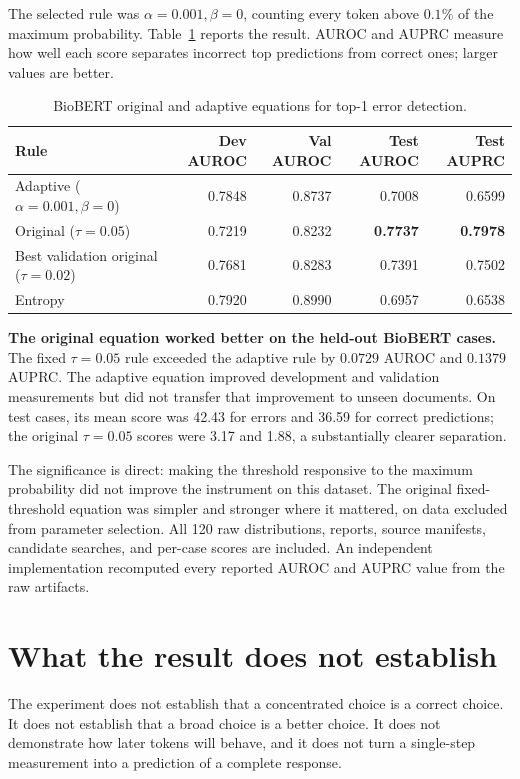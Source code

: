 \documentclass[11pt,a4paper]{article}
\begin{document}
The selected rule was $\alpha=0.001,\beta=0$, counting every token above $0.1\%$ of the maximum probability. Table~\ref{tab:biobert-optimization} reports the result. AUROC and AUPRC measure how well each score separates incorrect top predictions from correct ones; larger values are better.

\begin{table}[h]
\centering
\caption{BioBERT original and adaptive equations for top-1 error detection.}
\label{tab:biobert-optimization}
{\scriptsize
\setlength{\tabcolsep}{4pt}
\begin{tabular}{p{5.2cm}rrrr}
\toprule
Rule & Dev AUROC & Val AUROC & Test AUROC & Test AUPRC \\
\midrule
Adaptive ($\alpha=0.001,\beta=0$) & 0.7848 & 0.8737 & 0.7008 & 0.6599 \\
Original ($\tau=0.05$) & 0.7219 & 0.8232 & \textbf{0.7737} & \textbf{0.7978} \\
Best validation original ($\tau=0.02$) & 0.7681 & 0.8283 & 0.7391 & 0.7502 \\
Entropy & 0.7920 & 0.8990 & 0.6957 & 0.6538 \\
\bottomrule
\end{tabular}
}
\end{table}

\textbf{The original equation worked better on the held-out BioBERT cases.} The fixed $\tau=0.05$ rule exceeded the adaptive rule by $0.0729$ AUROC and $0.1379$ AUPRC. The adaptive equation improved development and validation measurements but did not transfer that improvement to unseen documents. On test cases, its mean score was 42.43 for errors and 36.59 for correct predictions; the original $\tau=0.05$ scores were 3.17 and 1.88, a substantially clearer separation.

The significance is direct: making the threshold responsive to the maximum probability did not improve the instrument on this dataset. The original fixed-threshold equation was simpler and stronger where it mattered, on data excluded from parameter selection. All 120 raw distributions, reports, source manifests, candidate searches, and per-case scores are included. An independent implementation recomputed every reported AUROC and AUPRC value from the raw artifacts.

\section{What the result does not establish}
The experiment does not establish that a concentrated choice is a correct choice. It does not establish that a broad choice is a better choice. It does not demonstrate how later tokens will behave, and it does not turn a single-step measurement into a prediction of a complete response.
\end{document}
